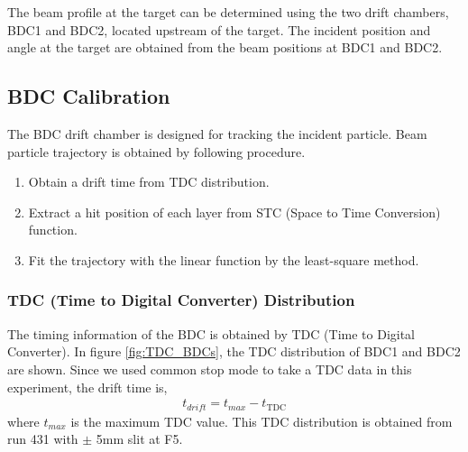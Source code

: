 The beam profile at the target can be determined using the two drift chambers, BDC1 and BDC2, located upstream of the target. The incident position and angle at the target are obtained from the beam positions at BDC1 and BDC2.

\subsection{BDC Calibration}
The BDC drift chamber is designed for tracking the incident particle. Beam particle trajectory is obtained by following procedure.

\begin{enumerate}
    \item Obtain a drift time from TDC distribution.
    \item Extract a hit position of each layer from STC (Space to Time Conversion) function.
    \item Fit the trajectory with the linear function by the least-square method.
\end{enumerate}

\subsubsection{TDC (Time to Digital Converter) Distribution}
The timing information of the BDC is obtained by TDC (Time to Digital Converter). In figure \ref{fig:TDC_BDCs}, the TDC distribution of BDC1 and BDC2 are shown. Since we used common stop mode to take a TDC data in this experiment, the drift time is,
\begin{align}
    t_{drift} = t_{max} - t_{\text{TDC}}
\end{align}
where $t_{max}$ is the maximum TDC value. This TDC distribution is obtained from run 431 with $\pm$ 5mm slit at F5. 

